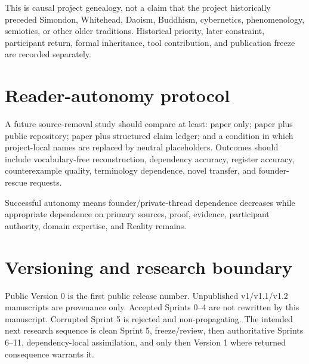 \documentclass[11pt]{article}
\begin{document}
This is causal project genealogy, not a claim that the project historically preceded Simondon, Whitehead, Daoism, Buddhism, cybernetics, phenomenology, semiotics, or other older traditions. Historical priority, later constraint, participant return, formal inheritance, tool contribution, and publication freeze are recorded separately.

\section{Reader-autonomy protocol}

A future source-removal study should compare at least: paper only; paper plus public repository; paper plus structured claim ledger; and a condition in which project-local names are replaced by neutral placeholders. Outcomes should include vocabulary-free reconstruction, dependency accuracy, register accuracy, counterexample quality, terminology dependence, novel transfer, and founder-rescue requests.

Successful autonomy means founder/private-thread dependence decreases while appropriate dependence on primary sources, proof, evidence, participant authority, domain expertise, and Reality remains.

\section{Versioning and research boundary}

Public Version 0 is the first public release number. Unpublished v1/v1.1/v1.2 manuscripts are provenance only. Accepted Sprints 0--4 are not rewritten by this manuscript. Corrupted Sprint 5 is rejected and non-propagating. The intended next research sequence is clean Sprint 5, freeze/review, then authoritative Sprints 6--11, dependency-local assimilation, and only then Version 1 where returned consequence warrants it.

\printbibliography
\end{document}

